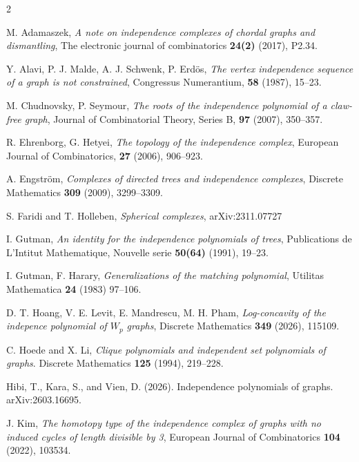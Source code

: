 \documentclass[12pt,amscd]{amsart}
\theoremstyle{definition}
\numberwithin{equation}{section}
\begin{document}
\begin{thebibliography}{2}


 M. Adamaszek,  \emph{A note on independence complexes of chordal graphs and dismantling}, The electronic journal of combinatorics {\bf 24(2)} (2017), P2.34.


 Y. Alavi, P. J. Malde, A. J. Schwenk, P. Erd\"{o}s,  \emph{The vertex independence sequence of a graph is not constrained}, Congressus Numerantium, \textbf{58} (1987), 15--23.


 M. Chudnovsky, P. Seymour,  \emph{The roots of the independence polynomial of a claw-free graph},  Journal of Combinatorial Theory, Series B, \textbf{97} (2007), 350--357.




 R. Ehrenborg, G. Hetyei,  \emph{The topology of the independence complex}, European Journal of Combinatorics, \textbf{27} (2006), 906--923.



 A. Engstr\"om,  \emph{Complexes of directed trees and independence complexes}, Discrete Mathematics \textbf{309} (2009), 3299--3309.


 S. Faridi and T. Holleben, \emph{Spherical complexes}, arXiv:2311.07727

 I. Gutman, \emph{An identity for the independence polynomials of trees}, Publications de L'Intitut Mathematique, Nouvelle serie  {\bf 50(64)} (1991), 19--23.


 I. Gutman, F. Harary, \emph{Generalizations of the matching polynomial}, Utilitas Mathematica \textbf{24} (1983) 97--106.


 D. T. Hoang, V. E. Levit, E. Mandrescu, M. H. Pham, \emph{Log-concavity of the indepence polynomial of $W_p$ graphs}, Discrete Mathematics {\bf 349} (2026), 115109.

 C. Hoede and X. Li, \textit{Clique polynomials and independent set polynomials of graphs}. Discrete Mathematics {\bf 125} (1994), 219--228.




 Hibi, T., Kara, S., and Vien, D. (2026). Independence polynomials of graphs. arXiv:2603.16695.


 J. Kim, \emph{The homotopy type of the independence complex of graphs with no induced cycles of length divisible by 3}, European Journal of Combinatorics {\bf 104} (2022), 103534.



\end{thebibliography}
\end{document}
